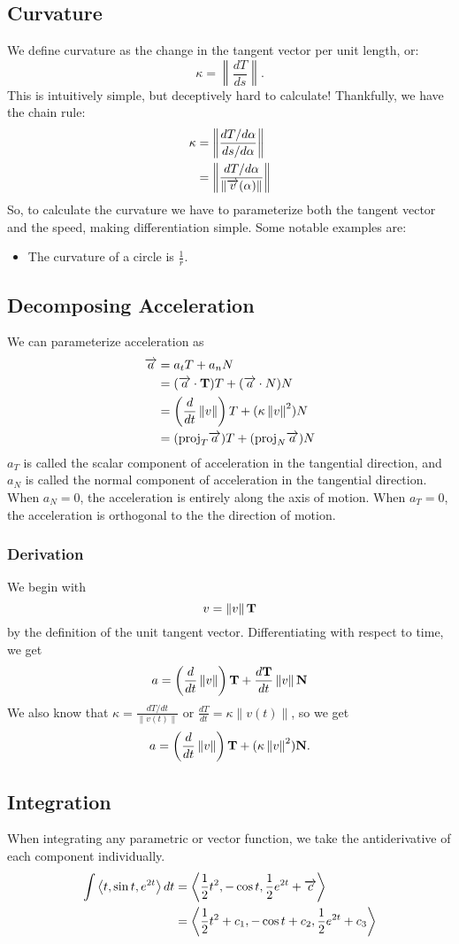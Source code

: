 \documentclass[12pt]{article}
\theoremstyle{plain} %
\theoremstyle{definition}
\theoremstyle{definition}
\theoremstyle{definition}
\theoremstyle{remark}
\newcommand{\vecv}{\vv{v}}
\newcommand{\angled}[1]{\left\langle {#1} \right\rangle}
\newcommand*{\vv}[1]{\overrightarrow{\mkern0mu#1}}
\renewcommand{\norm}[1]{\left\lVert#1\right\rVert}
\newcommand{\ddt}{\frac{d}{dt}}
\begin{document}
\subsection{Curvature}
We define curvature as the change in the tangent vector per unit length, or:
\[ \kappa = \norm{\frac{dT}{ds}}. \]
This is intuitively simple, but deceptively hard to calculate! Thankfully, we have the chain rule:
\begin{align*}
    \kappa & = \norm{\frac{dT/d\alpha}{ds/d\alpha}} \\
    & = \norm{\frac{dT/d\alpha}{\norm{\vecv(\alpha)}}}
\end{align*}
So, to calculate the curvature we have to parameterize both the tangent vector and the speed, making differentiation simple. Some notable examples are:
\begin{itemize}
    \item The curvature of a circle is $\frac{1}{r}$.
\end{itemize}
\subsection{Decomposing Acceleration}
We can parameterize acceleration as
\begin{align*}
\vv{a} &= a_tT + a_nN \\
& = (\vv{a} \cdot \vb{T})T + (\vv{a} \cdot N)N \\
& = \left(\ddt \norm{v}\right)T + (\kappa \norm{v}^2)N \\
& = (\text{proj}_T\vv{a})T + (\text{proj}_N\vv{a})N
\end{align*}
$a_T$ is called the scalar component of acceleration in the tangential direction, and $a_N$ is called the normal component of acceleration in the tangential direction. When $a_N=0$, the acceleration is entirely along the axis of motion. When $a_T=0$, the acceleration is orthogonal to the the direction of motion.
\subsubsection{Derivation}
We begin with
\[ v = \norm{v}\vb{T} \] by the definition of the unit tangent vector.
Differentiating with respect to time, we get
\[ a = \left(\ddt \norm{v}\right)\vb{T} + \frac{d \vb{T}}{dt} \norm{v} \vb{N} \]
We also know that $\kappa = \frac{dT/dt}{\norm{v(t)}}$ or $\frac{dT}{dt} = \kappa \norm{v(t)}$, so we get
\[ a = \left(\ddt \norm{v}\right)\vb{T} + (\kappa \norm{v}^2)\vb{N}. \]

\subsection{Integration}
When integrating any parametric or vector function, we take the antiderivative of each component individually.
\begin{align*}
    \int{\angled{t,\sin{t},e^{2t}}dt} &= \angled{\frac{1}{2}t^2,-\cos{t},\frac{1}{2}e^{2t} + \vv{c}} \\
    &= \angled{\frac{1}{2}t^2+c_1,-\cos{t}+c_2,\frac{1}{2}e^{2t}+c_3}
\end{align*}
\end{document}

